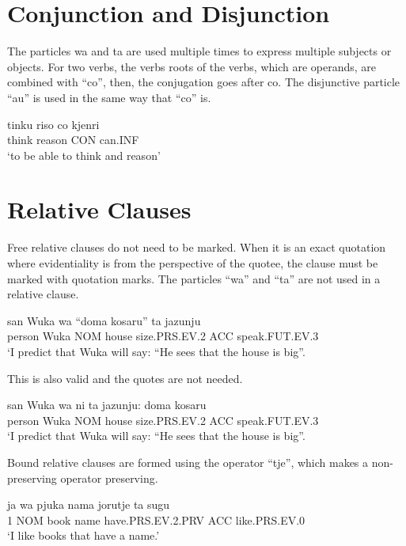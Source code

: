 \documentclass{clgrammar}
\begin{document}
\section{Conjunction and Disjunction}\label{junction}

The particles wa and ta are used multiple times to express multiple subjects or objects. For two verbs, the verbs roots of the verbs, which are operands, are combined with “co”, then, the conjugation goes after co. The disjunctive particle ``au'' is used in the same way that ``co'' is.

\begin{exe}
	\ex
	\gll tinku riso co kjenri\\
	think reason CON can.INF\\
	\trans `to be able to think and reason'
\end{exe}
\section{Relative Clauses}\label{relative-clauses}

Free relative clauses do not need to be marked. When it is an exact quotation where evidentiality is from the perspective of the quotee, the clause must be marked with quotation marks. The particles ``wa'' and ``ta'' are not used in a relative clause.

\begin{exe}
	\ex
	\gll san Wuka wa ``doma kosaru'' ta jazunju\\
	person Wuka NOM house size.PRS.EV.2 ACC speak.FUT.EV.3\\
	\trans `I predict that Wuka will say: ``He sees that the house is big''. 
\end{exe}

This is also valid and the quotes are not needed. 

\begin{exe}
	\ex
	\gll san Wuka wa ni ta jazunju: doma kosaru \\
	person Wuka NOM house size.PRS.EV.2 ACC speak.FUT.EV.3\\
	\trans `I predict that Wuka will say: ``He sees that the house is big''. 
\end{exe}


Bound relative clauses are formed using the operator ``tje'', which makes a non-preserving operator preserving.

\begin{exe}
	\ex
	\gll ja wa pjuka nama jorutje ta sugu  \\
	1 NOM book name have.PRS.EV.2.PRV ACC like.PRS.EV.0 \\
	\trans `I like books that have a name.'
\end{exe}
\end{document}
